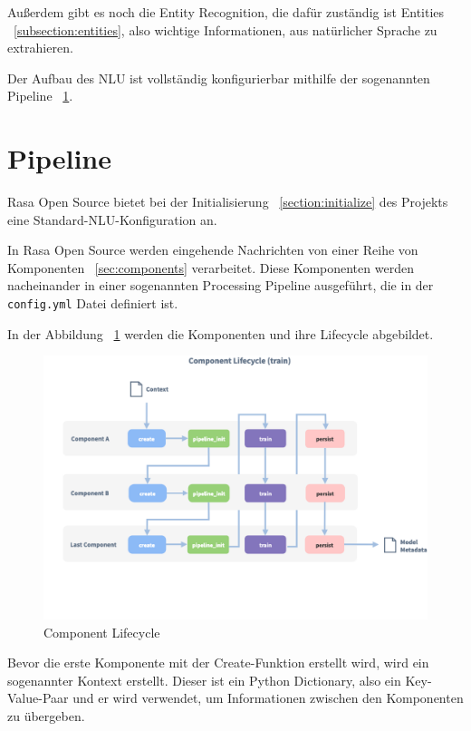 Außerdem gibt es noch die Entity Recognition, die dafür zuständig ist Entities ~\ref{subsection:entities}, also wichtige Informationen, aus natürlicher Sprache zu extrahieren.\cite{rasanlu}

Der Aufbau des NLU ist vollständig konfigurierbar mithilfe der sogenannten Pipeline ~\ref{sec:pipeline}.\cite{howToChooseAPipeline}

\section{Pipeline}\label{sec:pipeline}

Rasa Open Source bietet bei der Initialisierung ~\ref{section:initialize} des Projekts eine Standard-NLU-Konfiguration an.\cite{tuningYourModel}

In Rasa Open Source werden eingehende Nachrichten von einer Reihe von Komponenten ~\ref{sec:components} verarbeitet.
Diese Komponenten werden nacheinander in einer sogenannten Processing Pipeline ausgeführt, die in der \texttt{config.yml} Datei definiert ist.\cite{howToChooseAPipeline}

In der Abbildung ~\ref{fig:component_lifecycle} werden die Komponenten und ihre Lifecycle abgebildet.

\begin{figure}[hbt!]
    \centering
    \includegraphics[scale=0.25]{pics/component-lifecycle}
    \caption{Component Lifecycle~\cite{componentLifecycle}}
    \label{fig:component_lifecycle}
\end{figure}

Bevor die erste Komponente mit der Create-Funktion erstellt wird, wird ein sogenannter Kontext erstellt.
Dieser ist ein Python Dictionary, also ein Key-Value-Paar und er wird verwendet, um Informationen zwischen den Komponenten zu übergeben.\cite{componentLifecycle, componentLifecycleDoc}

